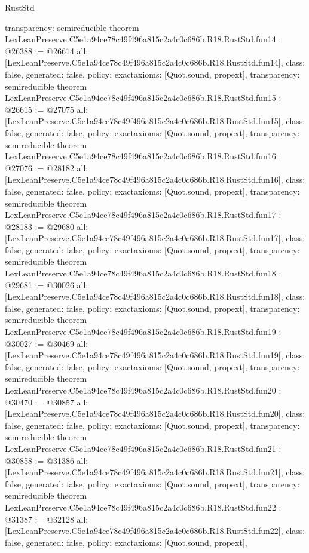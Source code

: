 \begin{lexlean}{RustStd}
\begin{coremodule}
{  transparency: semireducible
}
theorem LexLeanPreserve.C5e1a94ce78c49f496a815c2a4c0c686b.R18.RustStd.fun14 : @26388 := @26614 {
  all: [LexLeanPreserve.C5e1a94ce78c49f496a815c2a4c0c686b.R18.RustStd.fun14],
  class: false,
  generated: false,
  policy: exact{axioms: [Quot.sound, propext]},
  transparency: semireducible
}
theorem LexLeanPreserve.C5e1a94ce78c49f496a815c2a4c0c686b.R18.RustStd.fun15 : @26615 := @27075 {
  all: [LexLeanPreserve.C5e1a94ce78c49f496a815c2a4c0c686b.R18.RustStd.fun15],
  class: false,
  generated: false,
  policy: exact{axioms: [Quot.sound, propext]},
  transparency: semireducible
}
theorem LexLeanPreserve.C5e1a94ce78c49f496a815c2a4c0c686b.R18.RustStd.fun16 : @27076 := @28182 {
  all: [LexLeanPreserve.C5e1a94ce78c49f496a815c2a4c0c686b.R18.RustStd.fun16],
  class: false,
  generated: false,
  policy: exact{axioms: [Quot.sound, propext]},
  transparency: semireducible
}
theorem LexLeanPreserve.C5e1a94ce78c49f496a815c2a4c0c686b.R18.RustStd.fun17 : @28183 := @29680 {
  all: [LexLeanPreserve.C5e1a94ce78c49f496a815c2a4c0c686b.R18.RustStd.fun17],
  class: false,
  generated: false,
  policy: exact{axioms: [Quot.sound, propext]},
  transparency: semireducible
}
theorem LexLeanPreserve.C5e1a94ce78c49f496a815c2a4c0c686b.R18.RustStd.fun18 : @29681 := @30026 {
  all: [LexLeanPreserve.C5e1a94ce78c49f496a815c2a4c0c686b.R18.RustStd.fun18],
  class: false,
  generated: false,
  policy: exact{axioms: [Quot.sound, propext]},
  transparency: semireducible
}
theorem LexLeanPreserve.C5e1a94ce78c49f496a815c2a4c0c686b.R18.RustStd.fun19 : @30027 := @30469 {
  all: [LexLeanPreserve.C5e1a94ce78c49f496a815c2a4c0c686b.R18.RustStd.fun19],
  class: false,
  generated: false,
  policy: exact{axioms: [Quot.sound, propext]},
  transparency: semireducible
}
theorem LexLeanPreserve.C5e1a94ce78c49f496a815c2a4c0c686b.R18.RustStd.fun20 : @30470 := @30857 {
  all: [LexLeanPreserve.C5e1a94ce78c49f496a815c2a4c0c686b.R18.RustStd.fun20],
  class: false,
  generated: false,
  policy: exact{axioms: [Quot.sound, propext]},
  transparency: semireducible
}
theorem LexLeanPreserve.C5e1a94ce78c49f496a815c2a4c0c686b.R18.RustStd.fun21 : @30858 := @31386 {
  all: [LexLeanPreserve.C5e1a94ce78c49f496a815c2a4c0c686b.R18.RustStd.fun21],
  class: false,
  generated: false,
  policy: exact{axioms: [Quot.sound, propext]},
  transparency: semireducible
}
theorem LexLeanPreserve.C5e1a94ce78c49f496a815c2a4c0c686b.R18.RustStd.fun22 : @31387 := @32128 {
  all: [LexLeanPreserve.C5e1a94ce78c49f496a815c2a4c0c686b.R18.RustStd.fun22],
  class: false,
  generated: false,
  policy: exact{axioms: [Quot.sound, propext]},
}
\end{coremodule}
\end{lexlean}
